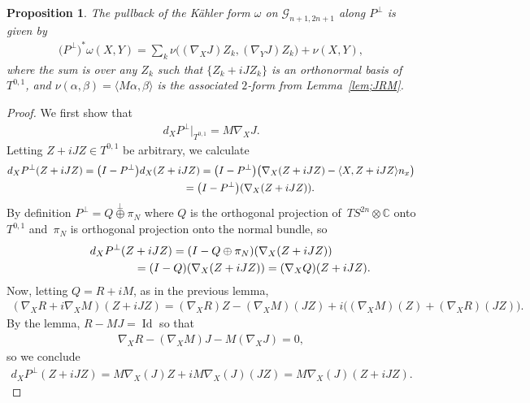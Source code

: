\documentclass[pdftex]{sigma}
\newtheorem{prop}[thm]{Proposition}
{ \theoremstyle{definition} \newtheorem{defn}[thm]{Definition}
 \newtheorem{ex}[thm]{Example}
 \newtheorem{rmk}[thm]{Remark}}
\numberwithin{equation}{section}
\newcommand{\CC}{\mathbb{C}}
\newcommand{\cG}{{\mathcal G}}
\begin{document}
\begin{prop} \label{prop;pull}The pullback of the K\"ahler form $\omega$ on $ \cG_{n+1,2n+1}$ along $P^\perp$ is given by
\begin{gather} \label{eq;pullomega}
\big(P^\perp\big)^*\omega(X,Y) = \sum_k \nu \big( (\nabla_X J) Z_k, (\nabla_Y J) Z_k \big) + \nu (X , Y),
\end{gather}
where the sum is over any $Z_k$ such that $\{Z_k + i J Z_k\}$ is an orthonormal basis of $T^{0,1}$, and $\nu(\alpha ,\beta) = \langle M \alpha, \beta \rangle$ is the associated $2$-form from Lemma~{\rm \ref{lem;JRM}}.
\end{prop}

\begin{proof}We first show that
\begin{gather*}
d_X P^\perp\big|_{T^{0,1}} = M \nabla_X J.
\end{gather*}
Letting $Z + iJZ \in T^{0,1}$ be arbitrary, we calculate
\begin{gather*}
d_X P^\perp (Z + i JZ) = \big(I-P^\perp\big) d_X (Z + iJZ)= \big(I-P^\perp\big) \big( \nabla_X(Z+iJZ) -\langle X,Z + i JZ\rangle n_x \big) \\
\hphantom{d_X P^\perp (Z + i JZ)}{} = \big(I-P^\perp\big) (\nabla_X(Z+iJZ)).
\end{gather*}
By definition $P^\perp = Q \stackrel{{\perp}}{\oplus} \pi_{N}$ where $Q$ is the orthogonal projection of~$TS^{2n} \otimes \CC$ onto $T^{0,1}$ and~$\pi_N$ is orthogonal projection onto the normal bundle, so
\begin{gather*}
d_X P^\perp (Z + i JZ) =(I- Q \oplus \pi_{N}) ( \nabla_X(Z+iJZ) ) \\
\hphantom{d_X P^\perp (Z + i JZ)}{} = (I-Q) ( \nabla_X(Z+iJZ) ) = (\nabla_X Q) (Z+iJZ).
\end{gather*}
Now, letting $Q= R + iM$, as in the previous lemma,
\begin{gather*}
(\nabla_X R + i \nabla_X M) (Z+iJZ) = ( \nabla_X R ) Z - (\nabla_X M) (JZ)
+ i \big( (\nabla_X M) (Z) + (\nabla_X R) (JZ) \big).
\end{gather*}
By the lemma, $R-MJ= \operatorname{Id}$ so that
\begin{gather*}
\nabla_X R - (\nabla_X M) J - M (\nabla_X J)= 0,
\end{gather*}
so we conclude
\begin{gather*}
d_X P^\perp (Z + i JZ) = M \nabla_X (J) Z + i M \nabla_X(J) (J Z) = M \nabla_X(J) (Z+iJZ).
\end{gather*}


\end{proof}
\end{document}
